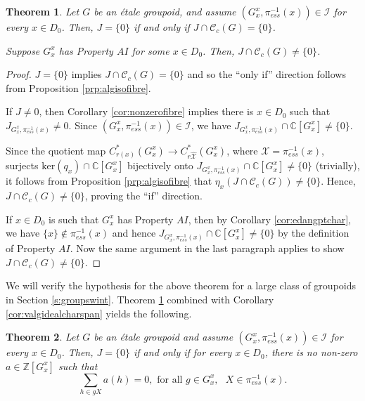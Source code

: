 \documentclass[a4paper, 12pt]{amsart}
\newtheorem{thm}{Theorem}[section]
\theoremstyle{definition}
\theoremstyle{remark}
\numberwithin{equation}{section}
\begin{document}
\begin{thm}
\label{thm:valgideal=videal}
Let $G$ be an \'etale groupoid, and assume $(G^{x}_{x}, \pi^{-1}_{ess}(x))\in\mathcal{I}$ for every $x\in D_{0}$. Then, $J = \{0\}$ if and only if $J\cap\mathscr{C}_{c}(G) = \{0\}$.

Suppose $G^{x}_{x}$ has Property $AI$ for some $x\in D_{0}$. Then, $J\cap\mathscr{C}_{c}(G)\neq\{0\}$.
\end{thm}
\begin{proof}
    $J = \{0\}$ implies $J\cap\mathscr{C}_{c}(G) = \{0\}$ and so the ``only if'' direction follows from Proposition \ref{prp:algisofibre}.

    If $J\neq 0$, then Corollary \ref{cor:nonzerofibre} implies there is $x\in D_{0}$ such that $J_{G^{x}_{x}, \pi^{-1}_{ess}(x)} \neq 0$. Since $(G^{x}_{x}, \pi^{-1}_{ess}(x))\in \mathcal{I}$, we have $J_{G^{x}_{x}, \pi^{-1}_{ess}(x)}\cap \mathbb{C}[G^{x}_{x}]\neq \{0\}$. 
    
    Since the quotient map $C^{*}_{r(x)}(G^{x}_{x})\to C^{*}_{r\hat{\mathcal{X}}}(G^{x}_{x})$, where $\mathcal{X} = \pi^{-1}_{ess}(x)$, surjects $\text{ker}(q_{x})\cap\mathbb{C}[G^{x}_{x}]$ bijectively onto $J_{G^{x}_{x}, \pi^{-1}_{ess}(x)}\cap \mathbb{C}[G^{x}_{x}]\neq \{0\}$ (trivially), it follows from Proposition \ref{prp:algisofibre} that $\eta_{x}(J\cap\mathscr{C}_{c}(G))\neq \{0\}$. Hence, $J\cap\mathscr{C}_{c}(G)\neq\{0\}$, proving the ``if'' direction.

    If $x\in D_{0}$ is such that $G^{x}_{x}$ has Property $AI$, then by Corollary \ref{cor:edangptchar}, we have $\{x\}\notin \pi^{-1}_{ess}(x)$ and hence $J_{G^{x}_{x}, \pi^{-1}_{ess}(x)}\cap\mathbb{C}[G^{x}_{x}]\neq \{0\}$ by the definition of Property $AI$. Now the same argument in the last paragraph applies to show $J\cap\mathscr{C}_{c}(G)\neq\{0\}$.
    
\end{proof}

We will verify the hypothesis for the above theorem for a large class of groupoids in Section \ref{s:groupswint}. Theorem \ref{thm:valgideal=videal} combined with Corollary \ref{cor:valgidealcharspan} yields the following.

\begin{thm}
\label{thm:linearchar}
    Let $G$ be an \'etale groupoid and assume $(G^{x}_{x}, \pi^{-1}_{ess}(x))\in\mathcal{I}$ for every $x\in D_{0}$. Then, $J = \{0\}$ if and only if for every  $x\in D_{0}$, there is no non-zero $a\in\mathbb{Z}[G^{x}_{x}]$ such that
    $$\sum_{h\in gX}a(h) = 0,\text{ for all }g\in G^{x}_{x},\text{ }X\in\pi^{-1}_{ess}(x).$$
\end{thm}
\end{document}
